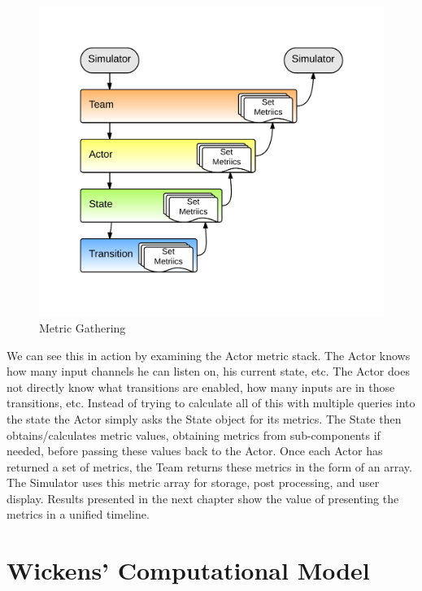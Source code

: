 \begin{figure}[h]
\begin{center}
\includegraphics[width=6in]{metric_gathering.png}
\caption{Metric Gathering}
\label{fig:metric_gathering}
\end{center}
\end{figure}


We can see this in action by examining the Actor metric stack.  The Actor knows how many input channels he can listen on, his current state, etc.  The Actor does not directly know what transitions are enabled, how many inputs are in those transitions, etc.  Instead of trying to calculate all of this with multiple queries into the state the Actor simply asks the State object for its metrics.  The State then obtains/calculates metric values, obtaining metrics from sub-components if needed, before passing these values back to the Actor.  Once each Actor has returned a set of metrics, the Team returns these metrics in the form of an array.  The Simulator uses this metric array for storage, post processing, and user display.  Results presented in the next chapter show the value of presenting the metrics in a unified timeline.



\section{Wickens' Computational Model}

